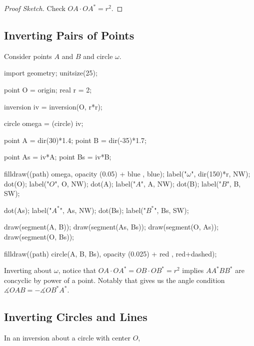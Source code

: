 \documentclass[]{scrartcl}
\begin{document}
\begin{proof}[Proof Sketch]
	Check $OA\cdot OA^* = r^2$.
\end{proof}


\subsection*{Inverting Pairs of Points}

Consider points $A$ and $B$ and circle $\omega$.

\begin{center}
	\begin{asy}
	import geometry;
	unitsize(25);

	point O = origin;
	real r = 2;

	inversion iv = inversion(O, r*r);

	circle omega = (circle) iv;

	point A = dir(30)*1.4;
	point B = dir(-35)*1.7;

	point As = iv*A;
	point Bs = iv*B;

	filldraw((path) omega, opacity (0.05) + blue , blue);
	label("$\omega$", dir(150)*r, NW);
	dot(O); label("$O$", O, NW);
	dot(A); label("$A$", A, NW);
	dot(B); label("$B$", B, SW);

	dot(As); label("$A^*$", As, NW);
	dot(Bs); label("$B^*$", Bs, SW);

	draw(segment(A, B)); draw(segment(As, Bs));
	draw(segment(O, As)); draw(segment(O, Bs));

	filldraw((path) circle(A, B, Bs), opacity (0.025) + red , red+dashed);
	\end{asy}
\end{center}

Inverting about $\omega$,
notice that $OA \cdot OA^* = OB\cdot OB^* = r^2$ implies $AA^* B B^*$ are concyclic by power of a point. 
Notably that gives us the angle condition $\measuredangle OAB = -\measuredangle OB^* A^*$.
\clearpage
\subsection*{Inverting Circles and Lines}

In an inversion about a circle with center $O$,
\end{document}
